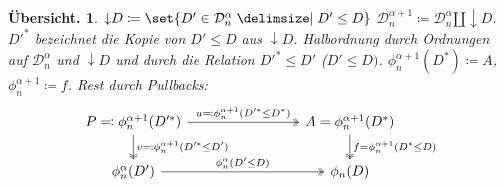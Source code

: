 \documentclass[a4paper, parskip=half]{scrartcl}
\theoremstyle{marginbreak}
\theoremstyle{nonumberplain}
\newtheorem{overview}{Übersicht.}
\newcommand\cat\mathcal
\newcommand{\down}[1]{{\downarrow}#1}
\newcommand{\n}{\pgfmatrixnextcell}
\begin{document}
{\begin{overview}
			$\down{D}\coloneqq\set{D'\in\cat{D}_n^\alpha\given D'\leq D}$
			$\cat{D}_n^{\alpha+1}\coloneqq\cat{D}_n^\alpha\amalg\down{D}$. $D'^*$
			bezeichnet die Kopie von $D'\leq D$ aus $\down{D}$. Halbordnung durch
			Ordnungen auf $\cat{D}_n^\alpha$ und $\down{D}$ und durch die Relation
			$D'^*\leq D'$ ($D'\leq D)$. $\phi_n^{\alpha+1}(D^*)\coloneqq A$,
			$\phi_n^{\alpha+1}\coloneqq f$. Rest durch Pullbacks:
			\[
				\begin{tikzcd}[column sep=8em]
					P \eqqcolon \phi_n^{\alpha+1}(D'^*)
						\ar[two heads]{d}{v\eqqcolon \phi_n^{\alpha + 1}(D'^*\leq D')}
						\ar[two heads]{r}{u\eqqcolon \phi_n^{\alpha+1}(D'^*\leq D^*)}
					\n A=\phi_n^{\alpha+1}(D^*)
						\ar[two heads]{d}{f = \phi_n^{\alpha+1}(D^*\leq D)}\\
					\phi_n^\alpha(D') \ar[two heads]{r}{\phi_n^\alpha(D'\leq D)} \n \phi_n(D)
				\end{tikzcd}
			\]
		\end{overview}}
\end{document}
